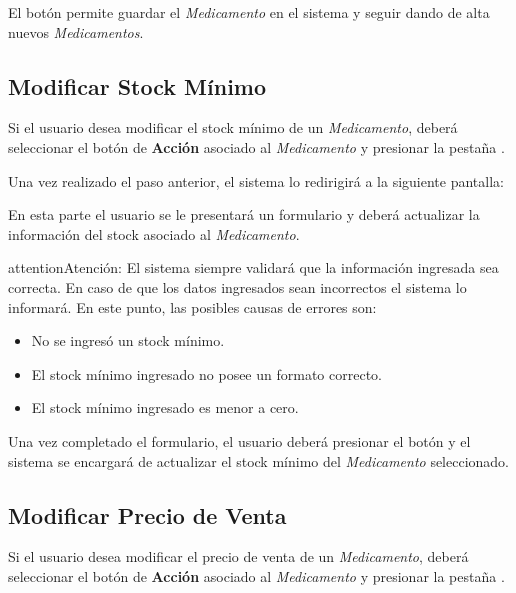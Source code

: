 \documentclass[a4paper,10pt,spanish]{sphinxmanual}
\begin{document}
El botón  permite guardar el \emph{Medicamento} en el sistema y seguir dando de alta nuevos \emph{Medicamentos}.


\subsection{Modificar Stock Mínimo}
\label{medicams:modificar-stock-minimo}\label{medicams:id2}
Si el usuario desea modificar el stock mínimo de un \emph{Medicamento}, deberá seleccionar el botón de \textbf{Acción} asociado al \emph{Medicamento} y presionar la pestaña .


Una vez realizado el paso anterior, el sistema lo redirigirá a la siguiente pantalla:


En esta parte el usuario se le presentará un formulario y deberá actualizar la información del stock asociado al \emph{Medicamento}.

\begin{notice}{attention}{Atención:}
El sistema siempre validará que la información ingresada sea correcta. En caso de que los datos ingresados sean incorrectos el sistema lo informará.
En este punto, las posibles causas de errores son:
\begin{itemize}
\item {} 
No se ingresó un stock mínimo.

\item {} 
El stock mínimo ingresado no posee un formato correcto.

\item {} 
El stock mínimo ingresado es menor a cero.

\end{itemize}
\end{notice}

Una vez completado el formulario, el usuario deberá presionar el botón  y el sistema se encargará de actualizar el stock mínimo del \emph{Medicamento} seleccionado.


\subsection{Modificar Precio de Venta}
\label{medicams:modificar-precio-venta}\label{medicams:modificar-precio-de-venta}
Si el usuario desea modificar el precio de venta de un \emph{Medicamento}, deberá seleccionar el botón de \textbf{Acción} asociado al \emph{Medicamento} y presionar la pestaña .
\end{document}
